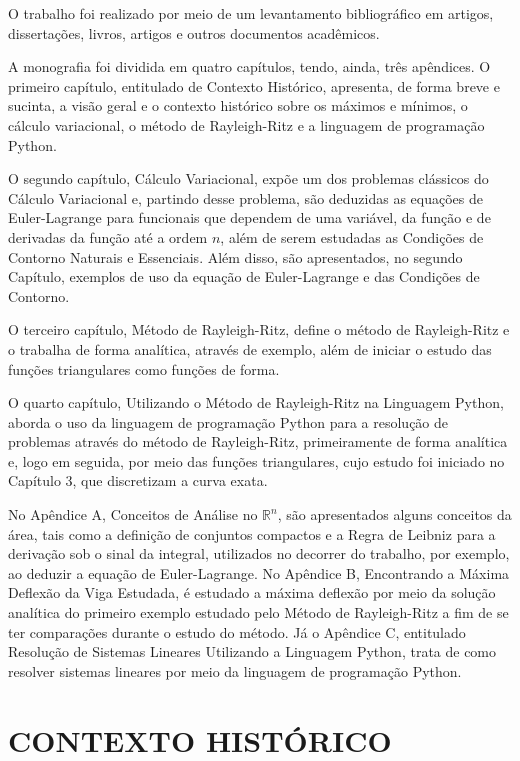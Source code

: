 \documentclass[
	12pt,				%
	openright,			%
    twoside,			%
	a4paper,			%
	english,			%
	french,				%
	spanish,			%
	brazil				%
	]{abntex2}
\numberwithin{lema}{chapter}
\numberwithin{teorema}{chapter}
\numberwithin{definicao}{chapter}
\numberwithin{exemplo}{chapter}
\numberwithin{figure}{chapter}
\begin{document}
O trabalho foi realizado por meio de um levantamento bibliográfico em artigos, dissertações, livros, artigos e outros documentos acadêmicos.

A monografia foi dividida em quatro capítulos, tendo, ainda, três apêndices. O primeiro capítulo, entitulado de Contexto Histórico, apresenta, de forma breve e sucinta, a visão geral e o contexto histórico sobre os máximos e mínimos, o cálculo variacional, o método de Rayleigh-Ritz e a linguagem de programação Python. 

O segundo capítulo, Cálculo Variacional, expõe um dos problemas clássicos do Cálculo Variacional e, partindo desse problema, são deduzidas as equações de Euler-Lagrange para funcionais que dependem de uma variável, da função e de derivadas da função até a ordem $n$, além de serem estudadas as Condições de Contorno Naturais e Essenciais. Além disso, são apresentados, no segundo Capítulo, exemplos de uso da equação de Euler-Lagrange e das Condições de Contorno. 

O terceiro capítulo, Método de Rayleigh-Ritz, define o método de Rayleigh-Ritz e o trabalha de forma analítica, através de exemplo, além de iniciar o estudo das funções triangulares como funções de forma. 

O quarto capítulo, Utilizando o Método de Rayleigh-Ritz na Linguagem Python, aborda o uso da linguagem de programação Python para a resolução de problemas através do método de Rayleigh-Ritz, primeiramente de forma analítica e, logo em seguida, por meio das funções triangulares, cujo estudo foi iniciado no Capítulo 3, que discretizam a curva exata.

No Apêndice A, Conceitos de Análise no $\mathbb{R}^n$, são apresentados alguns conceitos da área, tais como a definição de conjuntos compactos e a Regra de Leibniz para a derivação sob o sinal da integral, utilizados no decorrer do trabalho, por exemplo, ao deduzir a equação de Euler-Lagrange. No Apêndice B, Encontrando a Máxima Deflexão da Viga Estudada, é estudado a máxima deflexão por meio da solução analítica do primeiro exemplo estudado pelo Método de Rayleigh-Ritz a fim de se ter comparações durante o estudo do método. Já o Apêndice C, entitulado Resolução de Sistemas Lineares Utilizando a Linguagem Python, trata de como resolver sistemas lineares por meio da linguagem de programação Python.

\chapter{CONTEXTO HISTÓRICO}
\end{document}
